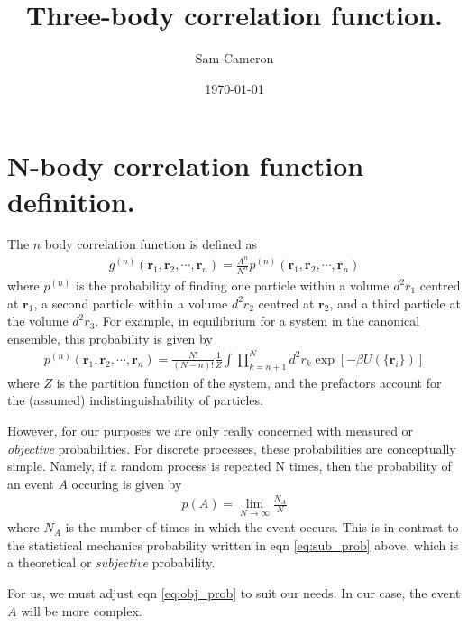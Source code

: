 \documentclass[twocolumn,amsmath,amssymb,aps]{revtex4-1}%
\begin{document}
 
\title{Three-body correlation function.}
\author{Sam Cameron}
%
\date{\today}

\begin{abstract}
\end{abstract}

\maketitle

\section{N-body correlation function definition.}

The $n$ body correlation function is defined as
\begin{align}
  g^(n)(\bm{r}_1,\bm{r}_2,\cdots,\bm{r}_n)
  = \frac{A^n}{N^n}p^(n)(\bm{r}_1,\bm{r}_2,\cdots,\bm{r}_n)
\end{align}
where $p^(n)$ is the probability of finding one particle within a
volume $d^2r_1$ centred at $\bm{r}_1$, a second particle within a
volume $d^2r_2$ centred at $\bm{r}_2$, and a third particle at the
volume $d^2r_3$. For example, in equilibrium for a system in the
canonical ensemble, this probability is given by
\begin{align}\label{eq:sub_prob}
  p^(n)(\bm{r}_1,\bm{r}_2,\cdots,\bm{r}_n)
  =\frac{N!}{(N-n)!}\frac{1}{Z}
  \int\prod_{k=n+1}^Nd^2r_k\exp[-\beta U(\{\bm{r}_i\})]
\end{align}
where $Z$ is the partition function of the system, and the prefactors
account for the (assumed) indistinguishability of particles.

However, for our purposes we are only really concerned with measured or
\textit{objective} probabilities. For discrete processes, these
probabilities are conceptually simple. Namely, if a random process is repeated
N times, then the probability of an event $A$ occuring is given by
\begin{align}\label{eq:obj_prob}
  p(A) = \lim_{N\to\infty} \frac{N_A}{N}
\end{align}
where $N_A$ is the number of times in which the event occurs. This is in
contrast to the statistical mechanics probability written in eqn
\ref{eq:sub_prob} above, which is
a theoretical or \textit{subjective} probability.

For us, we must adjust eqn \ref{eq:obj_prob} to suit our needs. In our case,
the event $A$ will be more complex.
\end{document}
